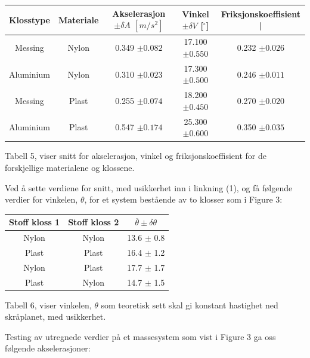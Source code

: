\documentclass[10pt,a4paper]{report}
\begin{document}
\begin{center}
  \begin{tabular}{| c | c | c | c | c |}
    \hline
    Klosstype & Materiale & Akselerasjon $\pm \delta A$ $[m/s^2]$ & Vinkel $\pm \delta V$ [$^{\circ}$] & Friksjonskoeffisient | \\ \hline
    Messing & Nylon & 0.349 $\pm 0.082$ & 17.100 $\pm 0.550$ & 0.232 $\pm 0.026$ \\ \hline
    Aluminium & Nylon & 0.310 $\pm 0.023$ & 17.300 $\pm 0.500$ & 0.246 $\pm 0.011$\\ \hline
    Messing & Plast & 0.255 $\pm 0.074$ & 18.200 $\pm 0.450$ & 0.270 $\pm 0.020$\\ \hline
    Aluminium & Plast & 0.547 $\pm 0.174$ & 25.300 $\pm 0.600$ & 0.350 $\pm 0.035$\\ \hline
  \end{tabular}
 \begin{tablenotes}
 	\small
 	\item Tabell 5, viser snitt for akselerasjon, vinkel og friksjonskoeffisient for de forskjellige materialene og klossene.
 	\end{tablenotes}
\end{center}

Ved å sette verdiene for snitt, med usikkerhet inn i linkning (1), og få følgende verdier for vinkelen, $\theta$, for et system bestående av to klosser som i Figure 3:

\begin{center}
  \begin{tabular}{| c | c | c |}
    \hline
    Stoff kloss 1 & Stoff kloss 2 & $\overline{\theta} \pm \delta\theta$ \\ \hline
    Nylon & Nylon & 13.6 $\pm$ 0.8 \\ \hline
    Plast & Plast & 16.4 $\pm$ 1.2 \\ \hline
    Nylon & Plast & 17.7 $\pm$ 1.7 \\ \hline
    Plast & Nylon & 14.7 $\pm$ 1.5  \\ \hline
  \end{tabular}
     \begin{tablenotes}
 	\small
 	\item Tabell 6, viser vinkelen, $\theta$ som teoretisk sett skal gi konstant hastighet ned skråplanet, med usikkerhet.
 	\end{tablenotes}
\end{center}
Testing av utregnede verdier på et massesystem som vist i Figure 3 ga oss følgende akselerasjoner:
\end{document}
